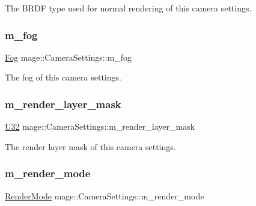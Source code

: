 The B\+R\+DF type used for normal rendering of this camera settings. \hypertarget{classmage_1_1_camera_settings_aef4d9aa95d6fe74fc241edab6de8bd3f}{}\label{classmage_1_1_camera_settings_aef4d9aa95d6fe74fc241edab6de8bd3f} 
\subsubsection{\texorpdfstring{m\+\_\+fog}{m\_fog}}
{\footnotesize\ttfamily \hyperlink{classmage_1_1_fog}{Fog} mage\+::\+Camera\+Settings\+::m\+\_\+fog\hspace{0.3cm}{\ttfamily [private]}}

The fog of this camera settings. \hypertarget{classmage_1_1_camera_settings_ad27594c8dc755e0dd8ca55564a4dff8b}{}\label{classmage_1_1_camera_settings_ad27594c8dc755e0dd8ca55564a4dff8b} 
\subsubsection{\texorpdfstring{m\+\_\+render\+\_\+layer\+\_\+mask}{m\_render\_layer\_mask}}
{\footnotesize\ttfamily \hyperlink{namespacemage_a41c104c036fba3756a74e19f793eeaa1}{U32} mage\+::\+Camera\+Settings\+::m\+\_\+render\+\_\+layer\+\_\+mask\hspace{0.3cm}{\ttfamily [private]}}

The render layer mask of this camera settings. \hypertarget{classmage_1_1_camera_settings_aa4d5139b4e8668c58507ead30812c84b}{}\label{classmage_1_1_camera_settings_aa4d5139b4e8668c58507ead30812c84b} 
\subsubsection{\texorpdfstring{m\+\_\+render\+\_\+mode}{m\_render\_mode}}
{\footnotesize\ttfamily \hyperlink{namespacemage_a9d24b35ed0bdecf8535e2b91fe0eebba}{Render\+Mode} mage\+::\+Camera\+Settings\+::m\+\_\+render\+\_\+mode\hspace{0.3cm}{\ttfamily [private]}}

